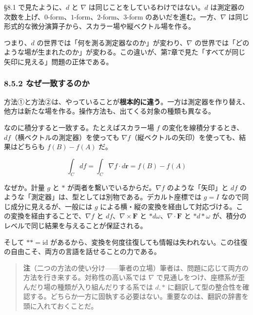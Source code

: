 \documentclass[a4paper,12pt,openany]{book}
\begin{document}
§8.1 で見たように、\(d\) と \(\nabla\)
は同じことをしているわけではない。\(d\)
は測定器の次数を上げ、\(0\)-form、\(1\)-form、\(2\)-form、\(3\)-form
のあいだを進む。一方、\(\nabla\)
は同じ形式的な微分演算子から、スカラー場や縦ベクトル場を作る。

つまり、\(d\) の世界では「何を測る測定器なのか」が変わり、\(\nabla\)
の世界では「どのような場が生まれたのか」が変わる。この違いが、第7章で見た「すべてが同じ矢印に見える」問題の正体である。

\hypertarget{ux306aux305cux4e00ux81f4ux3059ux308bux306eux304b}{%
\subsubsection{8.5.2
なぜ一致するのか}\label{ux306aux305cux4e00ux81f4ux3059ux308bux306eux304b}}

方法①と方法②は、やっていることが\textbf{根本的に違う}。一方は測定器を作り替え、他方は新たな場を作る。操作方法も、出てくる対象の種類も異なる。

なのに積分すると一致する。たとえばスカラー場 \(f\)
の変化を線積分するとき、\(df\)（横ベクトルの測定器）を使っても
\(\nabla f\)（縦ベクトルの矢印）を使っても、結果はどちらも \(f(B)-f(A)\)
だ。

\[\int_C df = \int_C \nabla f \cdot d\mathbf{r} = f(B) - f(A)\]

なぜか。計量 \(g\) と \(\ast\) が両者を繫いでいるからだ。\(\nabla f\)
のような「矢印」と \(df\)
のような「測定器」は、型としては別物である。デカルト座標では \(g=I\)
なので同じ成分に見えるが、一般には \(g\)
による横・縦の変換を経由して対応づける。この変換を経由することで、\(\nabla f\)
と \(df\)、\(\nabla\times\mathbf{F}\) と
\(\ast d\omega\)、\(\nabla\cdot\mathbf{F}\) と \(\ast d\ast\omega\)
が、積分のレベルで同じ結果を与えることが保証される。

そして \(\ast\ast = \mathrm{id}\)
があるから、変換を何度往復しても情報は失われない。この往復の自由こそ、両方の言語を話せることの力である。

\begin{quote}
\textbf{注}（二つの方法の使い分け——筆者の立場）筆者は、問題に応じて両方の方法を行き来する。対称性の高い系では
\(\nabla\)
で見通しをつけ、座標系が歪んだり場の種類が入り組んだりする系では
\(d,\ast\)
に翻訳して型の整合性を確認する。どちらか一方に固執する必要はない。重要なのは、翻訳の辞書を頭に入れておくことだ。
\end{quote}
\end{document}
